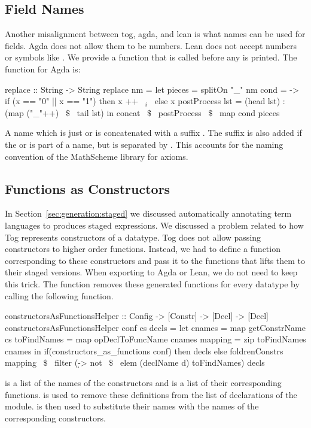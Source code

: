 \subsection{Field Names}
Another misalignment between tog, agda, and lean is what names can be used for fields. Agda does not allow them to be numbers. Lean does not accept numbers or symbols like \lstmath{+, *, \|>, <\|}. 
We provide a function  that is called before any  is printed. The  function for Agda is: 
\begin{hscode}
replace :: String -> String
replace nm =
  let pieces = splitOn "_" nm
      cond = \x -> if (x == "0" || x == "1") then x ++ ~$_i$~ else x
      postProcess lst = (head lst) : (map ("_"++) ~$\$$~ tail lst)
  in concat ~$\$$~ postProcess ~$\$$~ map cond pieces 
\end{hscode}
A name which is just  or  is concatenated with a suffix . The suffix is also added if the  or  is part of a name, but is separated by \lstmath{_}. This accounts for the naming convention of the MathScheme library for axioms. 

\subsection{Functions as Constructors}
In Section~\ref{sec:generation:staged} we discussed automatically annotating term languages to produces staged expressions. We discussed a problem related to how Tog represents constructors of a datatype. Tog does not allow passing constructors to higher order functions. Instead, we had to define a function corresponding to these constructors and pass it to the functions that lifts them to their staged versions. When exporting to Agda or Lean, we do not need to keep this trick. The function  removes these generated functions for every datatype by calling the following function. 
\begin{hscode} 
constructorsAsFunctionsHelper :: Config -> [Constr] -> [Decl] -> [Decl] 
constructorsAsFunctionsHelper conf cs decls =
  let cnames = map getConstrName cs
      toFindNames = map opDeclToFuncName cnames 
      mapping = zip toFindNames cnames
  in if(constructors_as_functions conf) then decls 
      else foldrenConstrs mapping ~$\$$~ 
               filter (\d -> not  ~$\$$~  elem (declName d) toFindNames) decls     
\end{hscode} 
\noindent {} is a list of the names of the constructors and  is a list of their corresponding functions.  is used to remove these definitions from the list of declarations of the module.  is then used to substitute their names with the names of the corresponding constructors. 

